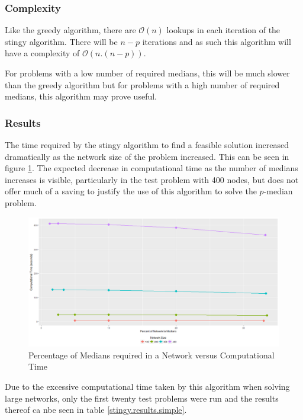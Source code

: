 \documentclass[11pt]{article}
\begin{document}
	
	\subsubsection{Complexity}
	Like the greedy algorithm, there are $\mathcal{O}(n)$ lookups in each iteration of the stingy algorithm.  There will be $n-p$ iterations and as such this algorithm will have a complexity of $\mathcal{O}(n.(n-p))$.
	
	For problems with a low number of required medians, this will be much slower than the greedy algorithm but for problems with a high number of required medians, this algorithm may prove useful.
	
	\subsubsection{Results}
	The time required by the stingy algorithm to find a feasible solution increased dramatically as the network size of the problem increased.  This can be seen in figure \ref{percentmedvstime_stingy}.  The expected decrease in computational time as the number of medians increases is visible, particularly in the test problem with 400 nodes, but does not offer much of a saving to justify the use of this algorithm to solve the $p$-median problem.	
	
		\begin{figure}[H]
			\begin{center}
				\includegraphics[width=14cm]{percentmedvstime_stingy.png}
				\caption{Percentage of Medians required in a Network versus Computational Time}
				\label{percentmedvstime_stingy}
			\end{center}
		\end{figure}
		
		Due to the excessive computational time taken by this algorithm when solving large networks, only the first twenty test problems were run and the results thereof ca nbe seen in table \ref{stingy.results.simple}.
		
\end{document}
